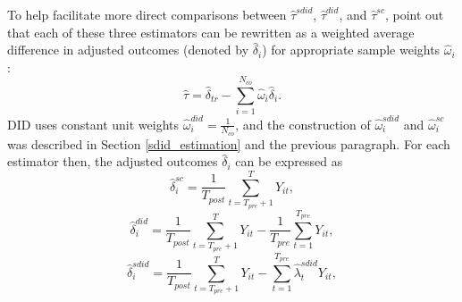\documentclass[../Main.tex]{subfiles}
\begin{document}
To help facilitate more direct comparisons between $\hat{\tau}^{sdid}$, $\hat{\tau}^{did}$, and $\hat{\tau}^{sc}$, \citet{arkhangelsky2021synthetic} point out that each of these three estimators can be rewritten as a weighted average difference in adjusted outcomes (denoted by $\hat{\delta}_i$) for appropriate sample weights $\hat{\omega}_i$:
\begin{equation}
    \hat{\tau}=\hat{\delta}_{tr}-\sum_{i=1}^{N_{co}}\hat{\omega}_i\hat{\delta}_i.
\end{equation}
DID uses constant unit weights $\hat{\omega}_i^{did}=\frac{1}{N_{co}}$, and the construction of $\hat{\omega}_i^{sdid}$ and $\hat{\omega}_i^{sc}$ was described in Section \ref{sdid_estimation} and the previous paragraph. For each estimator then, the adjusted outcomes $\hat{\delta}_i$ can be expressed as
\begin{equation}
    \hat{\delta}_i^{sc}=\frac{1}{T_{post}}\sum_{t=T_{pre}+1}^TY_{it},
\end{equation}
\begin{equation}
    \hat{\delta}_i^{did}=\frac{1}{T_{post}}\sum_{t=T_{pre}+1}^TY_{it} - \frac{1}{T_{pre}}\sum_{t=1}^{T_{pre}}Y_{it},
\end{equation}
\begin{equation}
    \hat{\delta}_i^{sdid}=\frac{1}{T_{post}}\sum_{t=T_{pre}+1}^TY_{it} - \sum_{t=1}^{T_{pre}}\hat{\lambda}_t^{sdid}Y_{it},
\end{equation}
\end{document}
